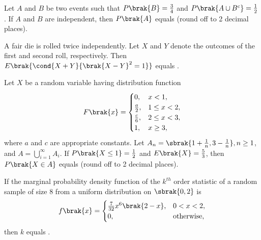 \iffalse
\chapter{2021}
\author{AI24BTECH11017}
\section{st}
\fi
\item Let $A$ and $B$ be two events such that $P\brak{B} = \frac{3}{4}$ and $P\brak{A \cup B^c} = \frac{1}{2}$. If $A$ and $B$ are independent, then $P\brak{A}$ equals \underline{\hspace{1cm}} (round off to 2 decimal places).

\item A fair die is rolled twice independently. Let $X$ and $Y$ denote the outcomes of the first and second roll, respectively. Then $E \brak{\cond {X + Y} {\brak{X - Y}^2 = 1}}$ equals \underline{\hspace{1cm}}.

\item Let $X$ be a random variable having distribution function
\begin{align*}
F\brak{x} = 
\begin{cases}
0, & x < 1, \\
\frac{a}{2}, & 1 \leq x < 2, \\
\frac{c}{6}, & 2 \leq x < 3, \\
1, & x \geq 3,
\end{cases}
\end{align*}
where $a$ and $c$ are appropriate constants. Let $A_n = \sbrak{ 1 + \frac{1}{n}, 3 - \frac{1}{n} }, n \geq 1$, and $A = \bigcup_{i=1}^{\infty} A_i$.
If $P\brak{X \leq 1} = \frac{1}{2}$ and $E\brak{X} = \frac{5}{3}$, then $P\brak{X \in A}$ equals \underline{\hspace{1cm}} (round off to 2 decimal places).

\item If the marginal probability density function of the $k^{th}$ order statistic of a random sample of size 8 from a uniform distribution on $\sbrak{0,2}$ is
\begin{align*}
f\brak{x} = 
\begin{cases}
\frac{7}{32} x^6 \brak{2 - x}, & 0 < x < 2, \\
0, & \text{otherwise},
\end{cases}
\end{align*}
then $k$ equals \underline{\hspace{1cm}}.

